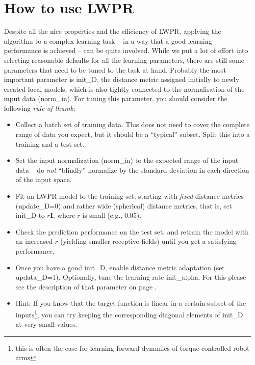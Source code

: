 \documentclass[11pt,a4paper]{article}
\newcommand{\mbf}{\mathbf}
\begin{document}
\section{How to use LWPR}

Despite all the nice properties and the efficiency of LWPR,
applying the algorithm to a complex learning task -- in a way that a
good learning performance is achieved -- can be quite involved.
While we put a lot of effort into selecting reasonable defaults
for all the learning parameters, there are still some parameters
that need to be tuned to the task at hand. Probably the most
important parameter is {\sf init\_D}, the distance metric assigned
initially to newly created local models, which is also tightly 
connected to the normalisation of the input data ({\sf norm\_in}).
For tuning this parameter, you should consider the following 
\emph{rule of thumb}:
\begin{itemize}
\item Collect a batch set of training data. This does not need to
      cover the complete range of data you expect, but it should
      be a ``typical'' subset. Split this into a training and a 
      test set.

\item Set the input normalization ({\sf norm\_in}) to the expected 
      range of the input data -- do \emph{not} ``blindly'' normalize
      by the standard deviation in each direction of the input space.
      
\item Fit an LWPR model to the training set, starting with \emph{fixed}
      distance metrics ({\sf update\_D=0}) and rather wide (spherical) 
      distance metrics, that is, set {\sf init\_D} to $r\mbf I$, where
      $r$ is small (e.g., 0.05).
      
\item Check the prediction performance on the test set, and retrain the
      model with an increased $r$ (yielding smaller receptive fields) 
      until you get a satisfying performance.
      
\item Once you have a good {\sf init\_D}, enable distance metric adaptation
      (set {\sf updata\_D=1}). Optionally, tune the learning rate
      {\sf init\_alpha}. For this please see the description of that
      parameter on page \pageref{parInitAlpha}.
      
\item Hint: If you know that the target function is linear in a certain subset
      of the inputs\footnote{this is often the case for learning forward
      dynamics of torque-controlled robot arms}, you can try keeping
      the corresponding diagonal elements of {\sf init\_D} at very
      small values.
      
\end{itemize}
\end{document}
